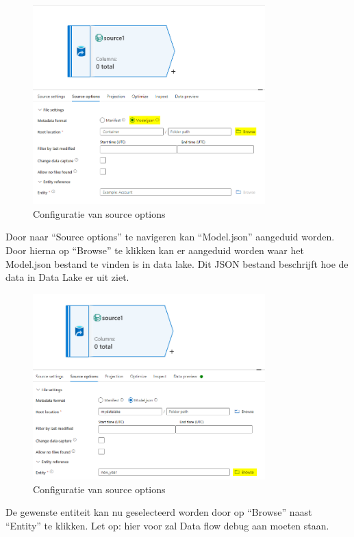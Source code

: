 \begin{figure}[H]
    \centering
    \includegraphics[width=0.8\textwidth]{./graphics/adf/source_table_4_specific.png}
    \caption{Configuratie van source options}
\end{figure}

Door naar ``Source options'' te navigeren kan ``Model.json'' aangeduid worden. Door hierna op ``Browse'' te klikken kan er aangeduid worden waar het Model.json bestand te vinden is in data lake. Dit JSON bestand beschrijft hoe de data in Data Lake er uit ziet.

\begin{figure}[H]
    \centering
    \includegraphics[width=0.8\textwidth]{./graphics/adf/source_table_5_specific.png}
    \caption{Configuratie van source options}
\end{figure}

De gewenste entiteit kan nu geselecteerd worden door op ``Browse'' naast ``Entity'' te klikken. Let op: hier voor zal Data flow debug aan moeten staan.

